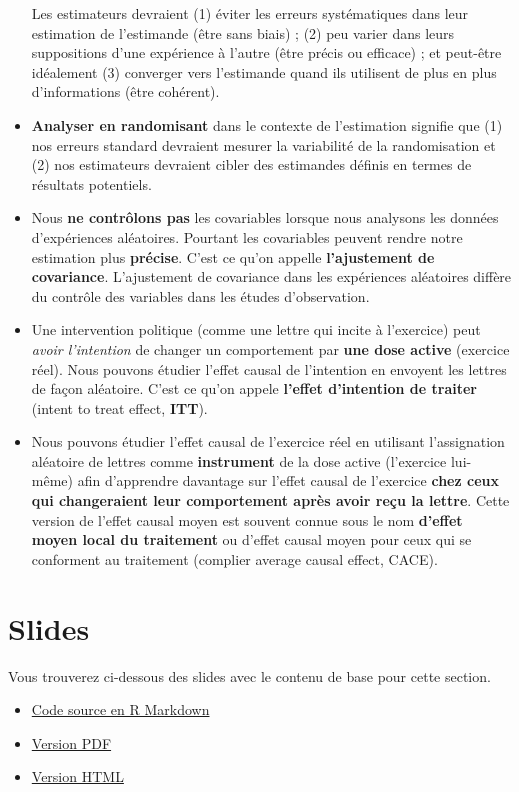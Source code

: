 \documentclass[
  12pt,
]{book}
\begin{document}
\begin{itemize}
  Les estimateurs devraient (1) éviter les erreurs systématiques dans leur estimation de l'estimande (être sans biais) ; (2) peu varier dans leurs suppositions d'une expérience à l'autre (être précis ou efficace) ; et peut-être idéalement (3) converger vers l'estimande quand ils utilisent de plus en plus d'informations (être cohérent).
\item
  \textbf{Analyser en randomisant} dans le contexte de l'estimation signifie que (1) nos erreurs standard devraient mesurer la variabilité de la randomisation et (2) nos estimateurs devraient cibler des estimandes définis en termes de résultats potentiels.
\item
  Nous \textbf{ne contrôlons pas} les covariables lorsque nous analysons les données d'expériences aléatoires. Pourtant les covariables peuvent rendre notre estimation plus \textbf{précise}. C'est ce qu'on appelle \textbf{l'ajustement de covariance}. L'ajustement de covariance dans les expériences aléatoires diffère du contrôle des variables dans les études d'observation.
\item
  Une intervention politique (comme une lettre qui incite à l'exercice) peut \emph{avoir l'intention} de changer un comportement par \textbf{une dose active} (exercice réel). Nous pouvons étudier l'effet causal de l'intention en envoyent les lettres de façon aléatoire. C'est ce qu'on appele \textbf{l'effet d'intention de traiter} (intent to treat effect, \textbf{ITT}).
\item
  Nous pouvons étudier l'effet causal de l'exercice réel en utilisant l'assignation aléatoire de lettres comme \textbf{instrument} de la dose active (l'exercice lui-même) afin d'apprendre davantage sur l'effet causal de l'exercice \textbf{chez ceux qui changeraient leur comportement après avoir reçu la lettre}. Cette version de l'effet causal moyen est souvent connue sous le nom \textbf{d'effet moyen local du traitement} ou d'effet causal moyen pour ceux qui se conforment au traitement (complier average causal effect, CACE).
\end{itemize}

\hypertarget{slides-4}{%
\section{Slides}\label{slides-4}}

Vous trouverez ci-dessous des slides avec le contenu de base pour cette section.

\begin{itemize}
\item
  \href{https://egap.github.io/learningdays-resources/Slides/estimation-slides.Rmd}{Code source en R Markdown}
\item
  \href{https://egap.github.io/learningdays-resources/Slides/estimation-slides.pdf}{Version PDF}
\item
  \href{https://egap.github.io/learningdays-resources/Slides/estimation-slides.html}{Version HTML}
\end{itemize}
\end{document}
